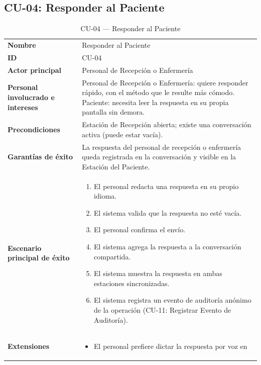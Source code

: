 \subsection{CU-04: Responder al Paciente}

\begin{longtable}{@{}>{\raggedright\arraybackslash}p{4.1cm} >{\raggedright\arraybackslash}p{\dimexpr\textwidth-4.1cm-2\tabcolsep\relax}@{}}
\caption{CU-04 --- Responder al Paciente}\\
\toprule
\textbf{Nombre} & Responder al Paciente \\
\textbf{ID} & CU-04 \\
\textbf{Actor principal} & Personal de Recepción o Enfermería \\
\textbf{Personal involucrado e intereses} &
Personal de Recepción o Enfermería: quiere responder rápido, con el método
que le resulte más cómodo. \newline
Paciente: necesita leer la respuesta en su propia pantalla sin demora. \\
\textbf{Precondiciones} &
Estación de Recepción abierta; existe una conversación activa (puede
estar vacía). \\
\textbf{Garantías de éxito} &
La respuesta del personal de recepción o enfermería queda registrada en la
conversación y visible en la Estación del Paciente. \\
\textbf{Escenario principal de éxito} &
\begin{enumerate}[leftmargin=*, itemsep=2pt]
    \item El personal redacta una respuesta en su propio idioma.
    \item El sistema valida que la respuesta no esté vacía.
    \item El personal confirma el envío.
    \item El sistema agrega la respuesta a la conversación compartida.
    \item El sistema muestra la respuesta en ambas estaciones
    sincronizadas.
    \item El sistema registra un evento de auditoría anónimo de la
    operación (CU-11: Registrar Evento de Auditoría).
\end{enumerate} \\
\textbf{Extensiones} &
\begin{itemize}[leftmargin=*, itemsep=2pt]
    \item[1a.] El personal prefiere dictar la respuesta por voz en

\end{itemize}
\end{longtable}
